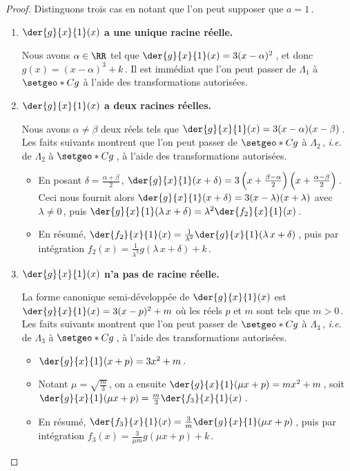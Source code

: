 \begin{proof}
	Distinguons trois cas en notant que l'on peut supposer que $a = 1$\,.
	\begin{enumerate}
		\item \textbf{$\der{g}{x}{1}(x)$ a une unique racine réelle.}

		\smallskip
		\noindent
		Nous avons $\alpha \in \RR$ tel que $\der{g}{x}{1}(x) = 3(x - \alpha)^2$\,, et donc $g(x) = (x - \alpha)^3 + k$\,.
		Il est immédiat que l'on peut passer de $\Lambda_1$ à $\setgeo*{C}{g}$ à l'aide des transformations autorisées.


		\item \textbf{$\der{g}{x}{1}(x)$ a deux racines réelles.}

		\smallskip
		\noindent
		Nous avons $\alpha \neq \beta$ deux réels tels que $\der{g}{x}{1}(x) = 3 (x - \alpha) (x - \beta)$\,.
		Les faits suivants montrent que l'on peut passer de $\setgeo*{C}{g}$ à $\Lambda_2$\,, \emph{i.e.} de $\Lambda_2$ à $\setgeo*{C}{g}$\,, à l'aide des transformations autorisées.
		\begin{itemize}
			\item En posant $\delta = \frac{\alpha + \beta}{2}$\,,
			$\der{g}{x}{1}(x + \delta) = 3 \left( x + \frac{\beta - \alpha}{2} \right) \left( x + \frac{\alpha - \beta}{2} \right)$\,.
			Ceci nous fournit alors
			$\der{g}{x}{1}(x + \delta) = 3 ( x - \lambda) (x + \lambda)$
			avec $\lambda \neq 0$\,,
			puis
			$\der{g}{x}{1}( \lambda \, x + \delta) = \lambda^2 \der{f_2}{x}{1}(x)$\,.
			
			\item En résumé,
			$\der{f_2}{x}{1}(x) = \frac{1}{\lambda^2} \der{g}{x}{1}(\lambda \, x + \delta)$\,,
			puis par intégration
			$f_2(x) = \frac{1}{\lambda^3} g(\lambda \, x + \delta) + k$\,.
		\end{itemize}




		\item \textbf{$\der{g}{x}{1}(x)$ n'a pas de racine réelle.}

		\smallskip
		\noindent
		La forme canonique semi-développée de $\der{g}{x}{1}(x)$ est
		$\der{g}{x}{1}(x) = 3(x - p)^2 + m$ où les réels $p$ et $m$ sont tels que $m > 0$\,.
		Les faits suivants montrent que l'on peut passer de $\setgeo*{C}{g}$ à $\Lambda_3$\,, \emph{i.e.} de $\Lambda_3$ à $\setgeo*{C}{g}$\,, à l'aide des transformations autorisées.
		\begin{itemize}
			\item $\der{g}{x}{1}(x + p) = 3 x^2 + m$\,.
			
			\item Notant $\mu = \sqrt{\frac{m}{3}}$\,, on a ensuite
			$\der{g}{x}{1}(\mu x + p) = m x^2 + m$\,,
			soit
			$\der{g}{x}{1}(\mu x + p) = \frac{m}{3} \der{f_3}{x}{1}(x)$\,.
			
			\item En résumé,
			$\der{f_3}{x}{1}(x) = \frac{3}{m} \der{g}{x}{1}(\mu x + p)$\,,
			puis par intégration
			$f_3(x) = \frac{3}{\mu m} g(\mu x + p) + k$\,.
		\end{itemize}
	\end{enumerate}
\end{proof}


